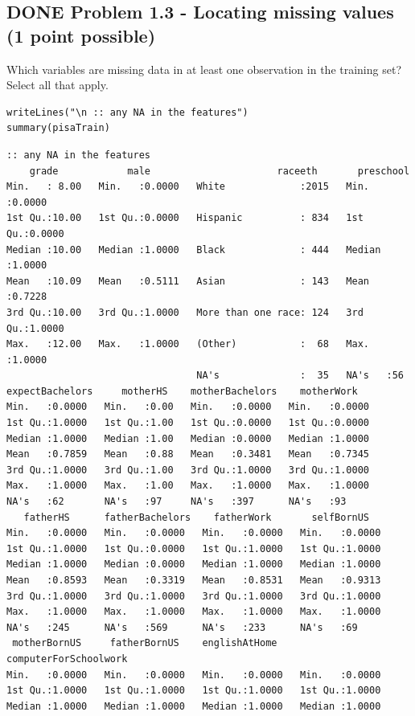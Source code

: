 \documentclass[letterpaper, 9pt, onecolumn, twoside, technote, final]{IEEEtran}
\begin{document}
\subsection{{\bfseries\sffamily DONE} Problem 1.3 - Locating missing values (1 point possible)}
\label{sec-2-3}
Which variables are missing data in at least one observation in the
training set? Select all that apply.

\begin{verbatim}
writeLines("\n :: any NA in the features")
summary(pisaTrain)
\end{verbatim}

\begin{verbatim}
:: any NA in the features
    grade            male                      raceeth       preschool
Min.   : 8.00   Min.   :0.0000   White             :2015   Min.   :0.0000
1st Qu.:10.00   1st Qu.:0.0000   Hispanic          : 834   1st Qu.:0.0000
Median :10.00   Median :1.0000   Black             : 444   Median :1.0000
Mean   :10.09   Mean   :0.5111   Asian             : 143   Mean   :0.7228
3rd Qu.:10.00   3rd Qu.:1.0000   More than one race: 124   3rd Qu.:1.0000
Max.   :12.00   Max.   :1.0000   (Other)           :  68   Max.   :1.0000
                                 NA's              :  35   NA's   :56
expectBachelors     motherHS    motherBachelors    motherWork
Min.   :0.0000   Min.   :0.00   Min.   :0.0000   Min.   :0.0000
1st Qu.:1.0000   1st Qu.:1.00   1st Qu.:0.0000   1st Qu.:0.0000
Median :1.0000   Median :1.00   Median :0.0000   Median :1.0000
Mean   :0.7859   Mean   :0.88   Mean   :0.3481   Mean   :0.7345
3rd Qu.:1.0000   3rd Qu.:1.00   3rd Qu.:1.0000   3rd Qu.:1.0000
Max.   :1.0000   Max.   :1.00   Max.   :1.0000   Max.   :1.0000
NA's   :62       NA's   :97     NA's   :397      NA's   :93
   fatherHS      fatherBachelors    fatherWork       selfBornUS
Min.   :0.0000   Min.   :0.0000   Min.   :0.0000   Min.   :0.0000
1st Qu.:1.0000   1st Qu.:0.0000   1st Qu.:1.0000   1st Qu.:1.0000
Median :1.0000   Median :0.0000   Median :1.0000   Median :1.0000
Mean   :0.8593   Mean   :0.3319   Mean   :0.8531   Mean   :0.9313
3rd Qu.:1.0000   3rd Qu.:1.0000   3rd Qu.:1.0000   3rd Qu.:1.0000
Max.   :1.0000   Max.   :1.0000   Max.   :1.0000   Max.   :1.0000
NA's   :245      NA's   :569      NA's   :233      NA's   :69
 motherBornUS     fatherBornUS    englishAtHome    computerForSchoolwork
Min.   :0.0000   Min.   :0.0000   Min.   :0.0000   Min.   :0.0000
1st Qu.:1.0000   1st Qu.:1.0000   1st Qu.:1.0000   1st Qu.:1.0000
Median :1.0000   Median :1.0000   Median :1.0000   Median :1.0000

\end{verbatim}
\end{document}
